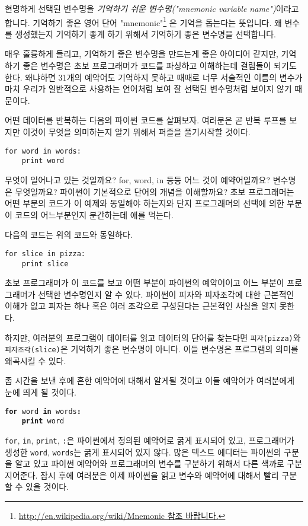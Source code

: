 현명하게 선택된 변수명을 \emph{기억하기 쉬운 변수명("mnemonic variable name")}이라고 합니다. 기억하기 좋은 영어 단어 "mnemonic"\footnote{ 
\url{http://en.wikipedia.org/wiki/Mnemonic 참조 바랍니다.}}
은 기억을 돕는다는 뜻입니다. 왜 변수를 생성했는지 기억하기 좋게 하기 위해서 기억하기 좋은 변수명을 선택합니다.

매우 훌륭하게 들리고, 기억하기 좋은 변수명을 만드는게 좋은 아이디어 같지만, 기억하기 좋은 변수명은 초보 프로그래머가 코드를 파싱하고 이해하는데 걸림돌이 되기도 한다. 왜냐하면 31개의 예약어도 기억하지 못하고 때때로 너무 서술적인 이름의 변수가 마치 우리가 일반적으로 사용하는 언어처럼 보여 잘 선택된 변수명처럼 보이지 않기 때문이다.

어떤 데이터를 반복하는 다음의 파이썬 코드를 살펴보자. 여러분은 곧 반복 루프를 보지만 이것이 무엇을 의미하는지 알기 위해서 퍼즐을 풀기시작할 것이다.

\beforeverb
\begin{verbatim}
for word in words:
    print word
\end{verbatim}
\afterverb
%
무엇이 일어나고 있는 것일까요? for, word, in 등등 어느 것이 예약어일까요? 변수명은 무엇일까요? 파이썬이 기본적으로 단어의 개념을 이해할까요? 초보 프로그래머는 어떤 부분의 코드가 이 예제와 동일해야 하는지와 단지 프로그래머의 선택에 의한 부분이 코드의 어느부분인지 분간하는데 애를 먹는다.

다음의 코드는 위의 코드와 동일하다.

\beforeverb
\begin{verbatim}
for slice in pizza:
    print slice
\end{verbatim}
\afterverb
%
초보 프로그래머가 이 코드를 보고 어떤 부분이 파이썬의 예약어이고 어느 부분이 프로그래머가 선택한 변수명인지 알 수 있다. 파이썬이 피자와 피자조각에 대한 근본적인 이해가 없고 피자는 하나 혹은 여러 조각으로 구성된다는 근본적인 사실을 알지 못한다.

하지만, 여러분의 프로그램이 데이터를 읽고 데이터의 단어를 찾는다면 {\tt 피자(pizza)}와 {\tt 피자조각(slice)}은 기억하기 좋은 변수명이 아니다. 이들 변수명은 프로그램의 의미를 왜곡시킬 수 있다.

좀 시간을 보낸 후에 흔한 예약어에 대해서 알게될 것이고 이들 예약어가 여러분에게 눈에 띄게 될 것이다.

{\tt {\bf for} word {\bf in} words{\bf :}\\
\verb"    "{\bf print} word }

{\tt for}, {\tt in}, {\tt print}, {\tt :}은 파이썬에서 정의된 예약어로 굵게 표시되어 있고, 프로그래머가 생성한 {\tt word}, {\tt words}는 굵게 표시되어 있지 않다. 많은 텍스트 에디터는 파이썬의 구문을 알고 있고 파이썬 예약어와 프로그래머의 변수를 구분하기 위해서 다른 색까로 구분지어준다. 잠시 후에 여러분은 이제 파이썬을 읽고 변수와 예약어에 대해서 빨리 구분할 수 있을 것이다.

